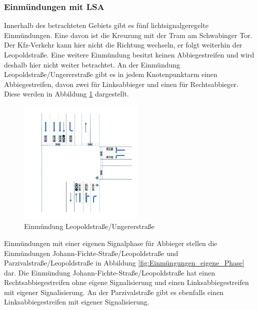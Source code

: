 \subsubsection{Einmündungen mit LSA}
Innerhalb des betrachteten Gebiets gibt es fünf lichtsignalgeregelte Einmündungen. Eine davon ist die Kreuzung mit der Tram am Schwabinger Tor. Der Kfz-Verkehr kann hier nicht die Richtung wechseln, er folgt weiterhin der Leopoldstraße. Eine weitere Einmündung besitzt keinen Abbiegestreifen und wird deshalb hier nicht weiter betrachtet. An der Einmündung Leopoldstraße/Ungererstraße gibt es in jedem Knotenpunktarm einen Abbiegestreifen, davon zwei für Linksabbieger und einen für Rechtsabbieger. Diese werden in Abbildung \ref{fig:Einmüngung_Abbiegestreifen} dargestellt.

\begin{savenotes}
	\begin{figure}[H]
		\centering
		\includegraphics[width=6cm,height=6cm]{figures/Einmuendung_Abbiegestreifen}
		\caption[Einmündung Leopoldstraaße/Ungererstraße]{Einmündung Leopoldstraße/Ungererstraße \parencite{Kutsch.05.04.2018}}\label{fig:Einmüngung_Abbiegestreifen}
	\end{figure}
\end{savenotes}

Einmündungen mit einer eigenen Signalphase für Abbieger stellen die Einmündungen Johann-Fichte-Straße/Leopoldstraße und Parzivalstraße/Leopoldstraße in Abbildung \ref{fig:Einmüngungen_eigene_Phase} dar. Die Einmündung Johann-Fichte-Straße/Leopoldstraße hat einen Rechtsabbiegestreifen ohne eigene Signalisierung und einen Linksabbiegestreifen mit eigener Signalisierung. An der Parzivalstraße gibt es ebenfalls einen Linksabbiegestreifen mit eigener Signalisierung.  

